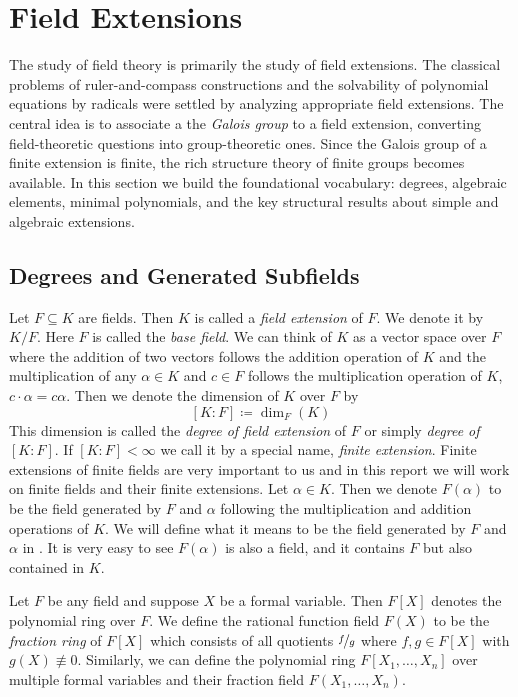 \section{Field Extensions}
The study of field theory is primarily the study of field extensions. The classical problems of ruler-and-compass constructions and the solvability of polynomial equations by radicals were settled by analyzing appropriate field extensions. The central idea is to associate a the \emph{Galois group} to a field extension, converting field-theoretic questions into group-theoretic ones. Since the Galois group of a finite extension is finite, the rich structure theory of finite groups becomes available. In this section we build the foundational vocabulary: degrees, algebraic elements, minimal polynomials, and the key structural results about simple and algebraic extensions.

\subsection{Degrees and Generated Subfields}
Let $F\subseteq K$ are fields. 
Then $K$ is called a \emph{field extension} of $F$. 
We denote it by $K/F$. 
Here $F$ is called the \emph{base field}. 
We can think of $K$ as a vector space over $F$ where the addition of two vectors follows the addition operation of $K$ and the multiplication of any $\alpha\in K$ and $c\in F$ follows the multiplication operation of $K$, $c\cdot \alpha=c\alpha$. 
Then we denote the dimension of $K$ over $F$ by  $$[K\colon F]\coloneqq\dim_F(K)$$This dimension is called the \emph{degree of field extension} of $F$ or simply \emph{degree of} $[K\colon F]$. 
If $[K\colon F]<\infty$ we call it by a special name, \emph{finite extension}. 
Finite extensions of finite fields are very important to us and in this report we will work on finite fields and their finite extensions. 
Let $\alpha\in K$. 
Then we denote $F(\alpha)$ to be the field generated by $F$ and $\alpha$ following the multiplication and addition operations of $K$. 
We will define what it means to be the field generated by $F$ and $\alpha$ in .
It is very easy to see $F(\alpha)$ is also a field, and it contains $F$ but also contained in $K$. 

Let $F$ be any field and suppose $X$ be a formal variable. 
Then $F[X]$ denotes the polynomial ring over $F$. 
We define the rational function field $F(X)$ to be the \emph{fraction ring} of $F[X]$ which consists of all quotients $\nicefrac{f}{g}$ where $f,g\in F[X]$ with $g(X)\not\equiv 0$.
Similarly, we can define the polynomial ring $F[X_1,\dots, X_n]$ over multiple formal variables and their fraction field $F(X_1,\dots, X_n)$.

